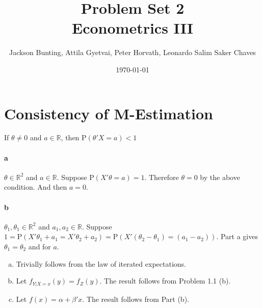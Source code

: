 \documentclass[11pt,letterpaper]{article}                  %
\title{Problem Set 2 \\ \medskip \Large{Econometrics III}}
\author{\Large Jackson Bunting, Attila Gyetvai, Peter Horvath, Leonardo Salim Saker Chaves}
\date{\today}
\begin{document}
\maketitle
\section{Consistency of M-Estimation} 


\begin{problem}
\end{problem}

\bigskip
\begin{problem}
If $\theta \neq 0$ and $a \in \mathbb{R}$, then
$\mathrm{P}(\theta' X = a) < 1$
\paragraph*{a}
$\theta \in \mathbb{R}^2$ and $a \in \mathbb{R}$. Suppose
$\mathrm{P}(X'\theta = a) = 1$. Therefore $\theta = 0$ by the above
condition. And then $a = 0$.

\paragraph*{b}
$\theta_1,\theta_1 \in \mathbb{R}^2$ and $a_1,a_2 \in
\mathbb{R}$. Suppose $1 = \mathrm{P}(X'\theta_1 + a_1 = X'\theta_2 +
a_2) = \mathrm{P}\left(X'(\theta_2-\theta_1) = (a_1-a_2)\right)$. Part
a gives $\theta_1 = \theta_2$ and for $a$.
\end{problem}

\bigskip
\begin{problem}
\begin{enumerate}[(a)]
	\item Trivially follows from the law of iterated expectations.

	\item Let $f_{Y|X=x} (y) = f_Z (y)$.
	The result follows from Problem 1.1 (b).

	\item Let $f(x) = \alpha + \beta' x$.
	The result follows from Part (b).
\end{enumerate}
\end{problem}

\end{document}

